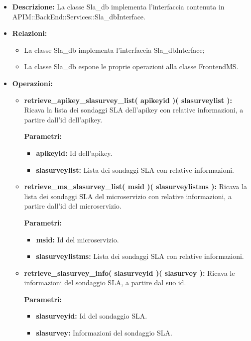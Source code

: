 \begin{itemize}
	\item \textbf{Descrizione:} La classe Sla\_db implementa l'interfaccia contenuta in APIM::BackEnd::Services::Sla\_dbInterface.
	\item \textbf{Relazioni:}
		\begin{itemize}
			\item La classe Sla\_db implementa l'interfaccia Sla\_dbInterface;
			\item La classe Sla\_db espone le proprie operazioni alla classe FrontendMS.
		\end{itemize}
	\item \textbf{Operazioni:}
		\begin{itemize}
		
			\item \textbf{retrieve\_apikey\_slasurvey\_list( apikeyid )( slasurveylist ):} Ricava la lista dei sondaggi SLA dell'apikey con relative informazioni, a partire dall'id dell'apikey.
				\begin{description}
    				\item[\textbf{Parametri:}]
				\end{description}
				\begin{itemize}
					\item \textbf{apikeyid:} Id dell'apikey.
					\item \textbf{slasurveylist:} Lista dei sondaggi SLA con relative informazioni.
				\end{itemize}
				
			\item \textbf{retrieve\_ms\_slasurvey\_list( msid )( slasurveylistms ):} Ricava la lista dei sondaggi SLA del microservizio con relative informazioni, a partire dall'id del microservizio.
				\begin{description}
    				\item[\textbf{Parametri:}]
				\end{description}
				\begin{itemize}
					\item \textbf{msid:} Id del microservizio.
					\item \textbf{slasurveylistms:} Lista dei sondaggi SLA con relative informazioni.
				\end{itemize}
				
			\item \textbf{retrieve\_slasurvey\_info( slasurveyid )( slasurvey ):} Ricava le informazioni del sondaggio SLA, a partire dal suo id.
				\begin{description}
    				\item[\textbf{Parametri:}]
				\end{description}
				\begin{itemize}
					\item \textbf{slasurveyid:} Id del sondaggio SLA.
					\item \textbf{slasurvey:} Informazioni del sondaggio SLA.
				\end{itemize}
				

\end{itemize}
\end{itemize}
